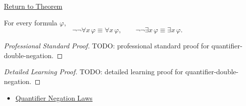 \newpage
{}
\label{prf:quantifier-double-negation}

\begin{remark*}[Return]
\hyperref[thm:quantifier-double-negation]{Return to Theorem}
\end{remark*}

\begin{theorem*}
For every formula \(\varphi\),
\[
\neg\neg\forall x\,\varphi \equiv \forall x\,\varphi,
\qquad
\neg\neg\exists x\,\varphi \equiv \exists x\,\varphi.
\]
\end{theorem*}

\begin{proof}[Professional Standard Proof]
\LRAProofBodyStart
TODO: professional standard proof for quantifier-double-negation.
\end{proof}

\begin{proof}[Detailed Learning Proof]
\LRAProofBodyStart
TODO: detailed learning proof for quantifier-double-negation.
\end{proof}

\begin{remark*}
\end{remark*}

\begin{dependencies}
\begin{itemize}
  \item \hyperref[thm:qneg]{Quantifier Negation Laws}
\end{itemize}
\end{dependencies}

\clearpage

